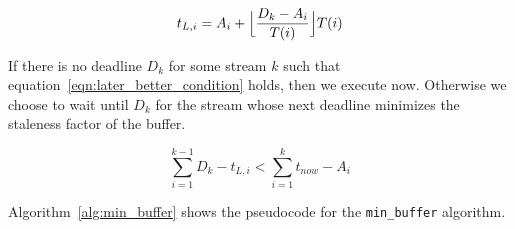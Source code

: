 \begin{equation}
t_{L,i} = A_{i} + \Bigl\lfloor \frac{D_{k}-A_{i}}{T(i)} \Bigr\rfloor T(i)
\label{eqn:last_deadline}
\end{equation}

If there is no deadline $D_{k}$ for some stream $k$ such that equation~\ref{eqn:later_better_condition} holds, then we execute now.  Otherwise we choose to wait
until $D_{k}$ for the stream whose next deadline minimizes the staleness factor of the buffer.


\begin{equation}
\sum_{i=1}^{k-1} D_{k} - t_{L,i} < \sum_{i=1}^{k} t_{now} - A_{i}
\label{eqn:later_better_condition}
\end{equation}

Algorithm~\ref{alg:min_buffer} shows the pseudocode for the \texttt{min\_buffer} algorithm.



